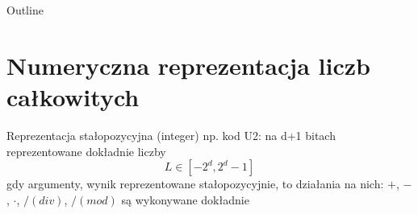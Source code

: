

\subtitle{2. Arytmetyka komputerowa}

  	\maketitle
	\begin{frame}{Outline}
		\tableofcontents
	\end{frame}
	\section{Numeryczna reprezentacja liczb całkowitych}
	\begin{frame}{Reprezentacja stałopozycyjna (integer)}
		np. kod U2: na d+1 bitach reprezentowane dokładnie liczby
        \[
        L \in [-2^d, 2^d-1]
        \]
        gdy argumenty, wynik reprezentowane stałopozycyjnie, to działania na nich: $+$, $-$, $\cdot$, $/ (div)$, $/ (mod)$ są wykonywane dokładnie
	\end{frame}
